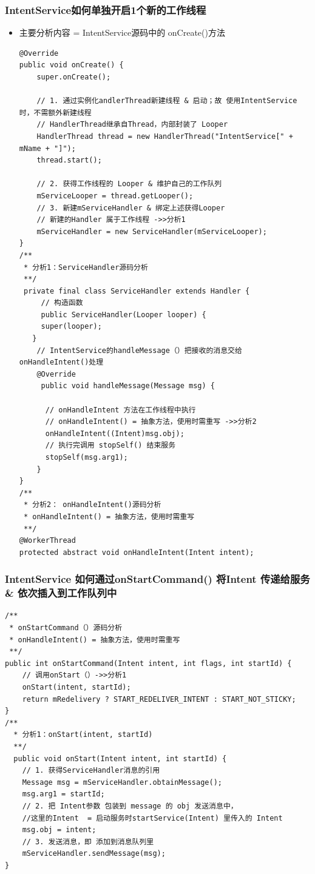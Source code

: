 \documentclass[9pt, b5paper]{article}
\begin{document}
\subsubsection{IntentService如何单独开启1个新的工作线程}
\label{sec-4-7-1}
\begin{itemize}
\item 主要分析内容  = IntentService源码中的 onCreate()方法
\begin{verbatim}
@Override
public void onCreate() {
    super.onCreate();
    
    // 1. 通过实例化andlerThread新建线程 & 启动；故 使用IntentService时，不需额外新建线程
    // HandlerThread继承自Thread，内部封装了 Looper
    HandlerThread thread = new HandlerThread("IntentService[" + mName + "]");
    thread.start();
  
    // 2. 获得工作线程的 Looper & 维护自己的工作队列
    mServiceLooper = thread.getLooper();
    // 3. 新建mServiceHandler & 绑定上述获得Looper
    // 新建的Handler 属于工作线程 ->>分析1
    mServiceHandler = new ServiceHandler(mServiceLooper); 
}
/** 
 * 分析1：ServiceHandler源码分析
 **/ 
 private final class ServiceHandler extends Handler {
     // 构造函数
     public ServiceHandler(Looper looper) {
     super(looper);
   }
    // IntentService的handleMessage（）把接收的消息交给onHandleIntent()处理
    @Override
     public void handleMessage(Message msg) {

      // onHandleIntent 方法在工作线程中执行
      // onHandleIntent() = 抽象方法，使用时需重写 ->>分析2
      onHandleIntent((Intent)msg.obj);
      // 执行完调用 stopSelf() 结束服务
      stopSelf(msg.arg1);
    }
}
/** 
 * 分析2： onHandleIntent()源码分析
 * onHandleIntent() = 抽象方法，使用时需重写
 **/ 
@WorkerThread
protected abstract void onHandleIntent(Intent intent);
\end{verbatim}
\end{itemize}
\subsubsection{IntentService 如何通过onStartCommand() 将Intent 传递给服务 \& 依次插入到工作队列中}
\label{sec-4-7-2}
\begin{verbatim}
/** 
 * onStartCommand（）源码分析
 * onHandleIntent() = 抽象方法，使用时需重写
 **/ 
public int onStartCommand(Intent intent, int flags, int startId) {
    // 调用onStart（）->>分析1
    onStart(intent, startId);
    return mRedelivery ? START_REDELIVER_INTENT : START_NOT_STICKY;
}
/** 
  * 分析1：onStart(intent, startId)
  **/ 
  public void onStart(Intent intent, int startId) {
    // 1. 获得ServiceHandler消息的引用
    Message msg = mServiceHandler.obtainMessage();
    msg.arg1 = startId;
    // 2. 把 Intent参数 包装到 message 的 obj 发送消息中，
    //这里的Intent  = 启动服务时startService(Intent) 里传入的 Intent
    msg.obj = intent;
    // 3. 发送消息，即 添加到消息队列里
    mServiceHandler.sendMessage(msg);
}
\end{verbatim}
\end{document}
